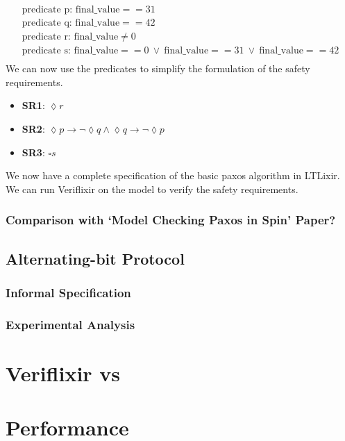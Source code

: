 \[
\begin{array}{l}
\text{predicate p: final\_value} == 31 \\
\text{predicate q: final\_value} == 42 \\
\text{predicate r: final\_value} \neq 0 \\
\text{predicate s: final\_value} == 0 \ \lor \ \text{final\_value} == 31 \ \lor \ \text{final\_value} == 42 \\
\end{array}
\]
We can now use the predicates to simplify the formulation of the safety requirements.
\begin{itemize}
    \item \textbf{SR1}: $\lozenge r$
    \item \textbf{SR2}: $\lozenge p \rightarrow \neg \lozenge q \land \lozenge q \rightarrow \neg \lozenge p$ 
    \item \textbf{SR3}: $\square s$
\end{itemize}
We now have a complete specification of the basic paxos algorithm in LTLixir. We can run Veriflixir on the model to verify the safety requirements.

\subsubsection{Comparison with `Model Checking Paxos in Spin' Paper?}
\subsection{Alternating-bit Protocol} \label{sec:ab}
\subsubsection{Informal Specification}
\subsubsection{Experimental Analysis}
\section{Veriflixir vs } \label{sec:vs}
\section{Performance} \label{sec:perf}